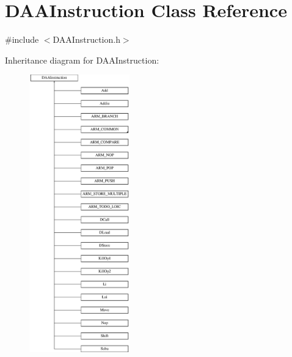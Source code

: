 \hypertarget{classDAAInstruction}{}\section{D\+A\+A\+Instruction Class Reference}
\label{classDAAInstruction}


{\ttfamily \#include $<$D\+A\+A\+Instruction.\+h$>$}

Inheritance diagram for D\+A\+A\+Instruction\+:\begin{figure}[H]
\begin{center}
\leavevmode
\includegraphics[height=12.000000cm]{classDAAInstruction}
\end{center}
\end{figure}
